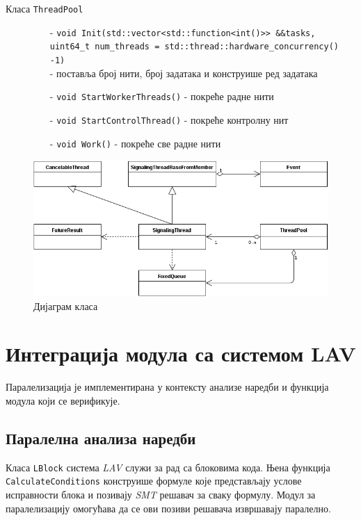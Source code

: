 \documentclass[12pt,oneside]{memoir}
\begin{document}
\begin{description}
\begin{itemize}
		\end{itemize}			
	\item[Класа \texttt{ThreadPool}]\leavevmode
		\begin{itemize}
			\item[-] \texttt{void Init(std::vector<std::function<int()>> \&\&tasks, 
			\\
			uint64\_t num\_threads = std::thread::hardware\_concurrency() -1)}
			\\
			 - поставља број нити, број задатака и конструише ред задатака	
			\item[-]\texttt{void StartWorkerThreads()} - покреће радне нити 			 		\item[-] \texttt{void StartControlThread()} - покреће контролну нит
			\item[-] \texttt{void Work()} - покреће све радне нити
		\end{itemize}			
\end{description}

\begin{figure}[!ht]
  \centering
  \includegraphics[width=1.0\textwidth]{img/class_diag.png}
  \caption{Дијаграм класа}
  \label{fig:klasa_dij}
\end{figure}

\section{Интеграција модула са системом LAV}

Паралелизација је имплементирана у контексту анализе наредби и функција модула који се верификује. 

\subsection{Паралелна анализа наредби}

Класа \texttt{LBlock} система \textit{LAV} служи за рад са блоковима кода. Њена функција \texttt{CalculateConditions} конструише формуле које представљају услове исправности блока и позивају \textit{SMT} решавач за сваку формулу. Модул за паралелизацију омогућава да се ови позиви решавача извршавају паралелно.
\end{document}
